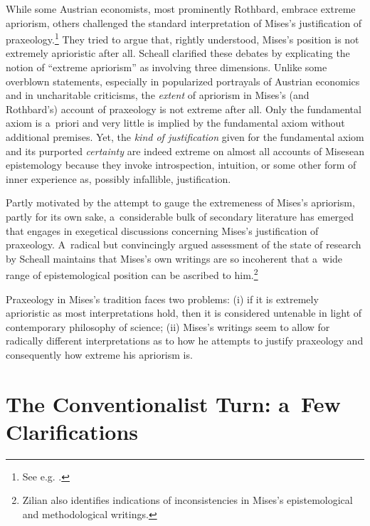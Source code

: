 While some Austrian economists, most prominently Rothbard, embrace extreme apriorism, others challenged the standard interpretation of Mises's justification of praxeology.\footnote{See e.g. 
\parencite[][]{zanotti_hermeneutics_2023}.%
} They tried to argue that, rightly understood, Mises's position is not extremely aprioristic after all. Scheall 
\parencite[][]{scheall_review_2017} %
 clarified these debates by explicating the notion of ``extreme apriorism'' as involving three dimensions. Unlike some overblown statements, especially in popularized portrayals of Austrian economics and in uncharitable criticisms, the \textit{extent} of apriorism in Mises's (and Rothbard's) account of praxeology is not extreme after all. Only the fundamental axiom is a~priori and very little is implied by the fundamental axiom without additional premises. Yet, the \textit{kind of justification} given for the fundamental axiom and its purported \textit{certainty} are indeed extreme on almost all accounts of Misesean epistemology because they invoke introspection, intuition, or some other form of inner experience as, possibly infallible, justification.



Partly motivated by the attempt to gauge the extremeness of Mises's apriorism, partly for its own sake, a~considerable bulk of secondary literature has emerged that engages in exegetical discussions concerning Mises's justification of praxeology. A~radical but convincingly argued assessment of the state of research by Scheall 
\parencite*[][]{scheall_rise_2023} %
 maintains that Mises's own writings are so incoherent that a~wide range of epistemological position can be ascribed to him.\footnote{Zilian 
\parencite*[][]{} %
 also identifies indications of inconsistencies in Mises's epistemological and methodological writings.}



Praxeology in Mises's tradition faces two problems: (i) if it is extremely aprioristic as most interpretations hold, then it is considered untenable in light of contemporary philosophy of science; (ii) Mises's writings seem to allow for radically different interpretations as to how he attempts to justify praxeology and consequently how extreme his apriorism is.



\section{The Conventionalist Turn: a~Few Clarifications}

